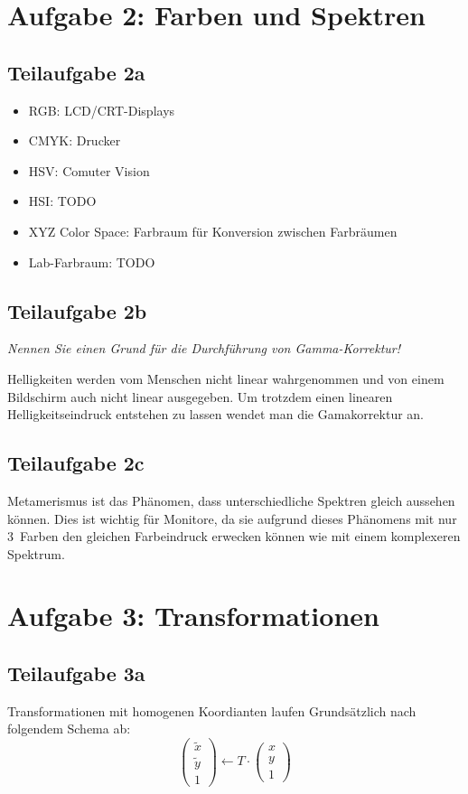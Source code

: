 \documentclass[a4paper]{scrartcl}
\begin{document}
\section*{Aufgabe 2: Farben und Spektren}
\subsection*{Teilaufgabe 2a}

\begin{itemize}
    \item RGB: LCD/CRT-Displays
    \item CMYK: Drucker
    \item HSV: Comuter Vision
    \item HSI: TODO
    \item XYZ Color Space: Farbraum für Konversion zwischen Farbräumen
    \item Lab-Farbraum: TODO
\end{itemize}

\subsection*{Teilaufgabe 2b}
\textit{Nennen Sie einen Grund für die Durchführung von Gamma-Korrektur!}

Helligkeiten werden vom Menschen nicht linear wahrgenommen und von einem
Bildschirm auch nicht linear ausgegeben. Um trotzdem einen linearen
Helligkeitseindruck entstehen zu lassen wendet man die Gamakorrektur an.

\subsection*{Teilaufgabe 2c}
Metamerismus ist das Phänomen, dass unterschiedliche Spektren gleich aussehen
können. Dies ist wichtig für Monitore, da sie aufgrund dieses Phänomens mit nur
3~Farben den gleichen Farbeindruck erwecken können wie mit einem komplexeren
Spektrum.

\section*{Aufgabe 3: Transformationen}
\subsection*{Teilaufgabe 3a}
Transformationen mit homogenen Koordianten laufen Grundsätzlich nach folgendem Schema ab:
\[\begin{pmatrix}\tilde{x}\\ \tilde{y} \\ 1\end{pmatrix} \gets T \cdot \begin{pmatrix}x\\ y \\ 1\end{pmatrix}\]
\end{document}
